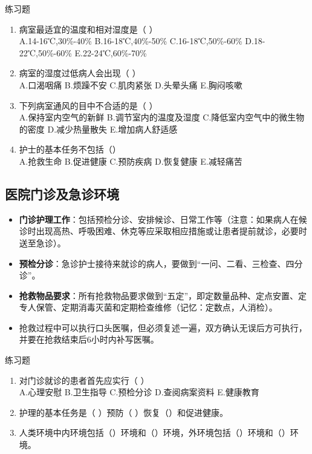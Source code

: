 \documentclass[11pt, a4paper]{ctexart}
\begin{document}
\begin{examplebox}{练习题}
	\begin{enumerate}
		\item 病室最适宜的温度和相对湿度是（ ）\\
		      A.14-16℃,30\%-40\% \quad B.16-18℃,40\%-50\% \quad C.16-18℃,50\%-60\% \quad D.18-22℃,50\%-60\% \quad E.22-24℃,60\%-70\%
		\item 病室的湿度过低病人会出现（ ）\\
		      A.口渴咽痛 \quad B.烦躁不安 \quad C.肌肉紧张 \quad D.头晕头痛 \quad E.胸闷咳嗽
		\item 下列病室通风的目中不合适的是（ ）\\
		      A.保持室内空气的新鲜 \quad B.调节室内的温度及湿度 \quad C.降低室内空气中的微生物的密度 \quad D.减少热量散失 \quad E.增加病人舒适感
		\item 护士的基本任务不包括（\qquad）\\
		      A.抢救生命 \quad B.促进健康 \quad C.预防疾病 \quad D.恢复健康 \quad E.减轻痛苦
	\end{enumerate}
\end{examplebox}

\subsection{医院门诊及急诊环境}
\begin{itemize}
	\item \textbf{门诊护理工作}：包括预检分诊、安排候诊、日常工作等（注意：如果病人在候诊时出现高热、呼吸困难、休克等应采取相应措施或让患者提前就诊，必要时送至急诊）。
	\item \textbf{预检分诊}：急诊护士接待来就诊的病人，要做到“一问、二看、三检查、四分诊”。
	\item \textbf{抢救物品要求}：所有抢救物品要求做到“五定”，即定数量品种、定点安置、定专人保管、定期消毒灭菌和定期检查维修（记忆：定数点，人消检）。
	\item 抢救过程中可以执行口头医嘱，但必须复述一遍，双方确认无误后方可执行，并要在抢救结束后6小时内补写医嘱。
\end{itemize}

\begin{examplebox}{练习题}
	\begin{enumerate}
		\item 对门诊就诊的患者首先应实行（ ）\\
		      A.心理安慰 \quad B.卫生指导 \quad C.预检分诊 \quad D.查阅病案资料 \quad E.健康教育
		\item 护理的基本任务是（     ）预防（   ）恢复（\qquad）和促进健康。
		\item 人类环境中内环境包括（\qquad）环境和（\qquad）环境，外环境包括（\qquad）环境和（\qquad）环境。
	\end{enumerate}
\end{examplebox}
\end{document}

